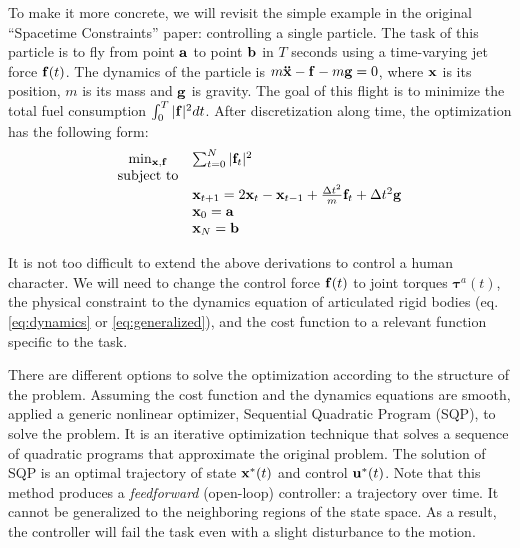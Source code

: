 To make it more concrete, we will revisit the simple example in the original ``Spacetime Constraints'' paper: controlling a single particle. The task of this particle is to fly from point $\mathbf{a}$ to point $\mathbf{b}$ in $T$ seconds using a time-varying jet force $\mathbf{f}(t)$. The dynamics of the particle is $m\mathbf{\ddot{x}}-\mathbf{f}-m\mathbf{g}=0$, where $\mathbf{x}$ is its position, $m$ is its mass and $\mathbf{g}$ is gravity. The goal of this flight is to minimize the total fuel consumption $\int_0^T|\mathbf{f}|^2dt$. After discretization along time, the optimization has the following form:
\begin{displaymath}
  \begin{array}{cl}
    \min_{\mathbf{x},\mathbf{f}}&\sum_{t=0}^{N}|\mathbf{f}_t|^2\\
    \textrm{subject to}&\\
    &\mathbf{x}_{t+1}= 2\mathbf{x}_{t} -\mathbf{x}_{t-1}+\frac{\Delta t^2}{m}\mathbf{f}_t+\Delta t^2\mathbf{g}\\
    &\mathbf{x}_0=\mathbf{a}\\
    &\mathbf{x}_N=\mathbf{b}
  \end{array}
  \end{displaymath}

It is not too difficult to extend the above derivations to control a human character. We will need to change the control force $\mathbf{f}(t)$ to joint torques $\boldsymbol{\tau}^a(t)$, the physical constraint to the dynamics equation of articulated rigid bodies (eq. \ref{eq:dynamics} or \ref{eq:generalized}), and the cost function to a relevant function specific to the task.

There are different options to solve the optimization according to the structure of the problem. Assuming the cost function and the dynamics equations are smooth, \citet{Witkin:1988} applied a generic nonlinear optimizer, Sequential Quadratic Program (SQP), to solve the problem. It is an iterative optimization technique that solves a sequence of quadratic programs that approximate the original problem. The solution of SQP is an optimal trajectory of state $\mathbf{x}^*(t)$ and control $\mathbf{u}^*(t)$. Note that this method produces a \emph{feedforward} (open-loop) controller: a trajectory over time. It cannot be generalized to the neighboring regions of the state space. As a result, the controller will fail the task even with a slight disturbance to the motion.

